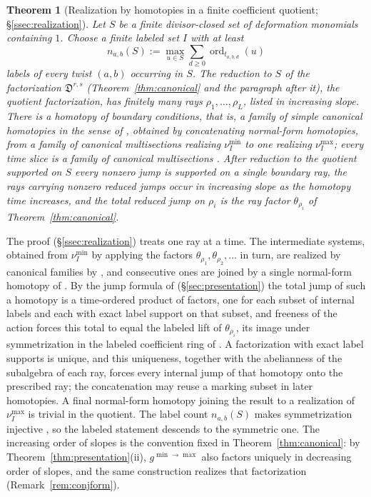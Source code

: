\documentclass[11pt]{amsart}
\newtheorem{theorem}{Theorem}[section]
\theoremstyle{definition}
\theoremstyle{remark}
\newcommand{\Dscr}{\mathfrak{D}}
\begin{document}
\begin{theorem}[Realization by homotopies in a finite coefficient quotient;
  \S\ref{ssec:realization}]
\label{thm:georealization}
Let $S$ be a finite divisor-closed set of deformation monomials containing
$1$.  Choose a finite labeled set $I$ with at least
\[
n_{a,b}(S):=\max_{u\in S}\sum_{d\ge0}\operatorname{ord}_{t_{a,b,d}}(u)
\]
  labels of every twist $(a,b)$ occurring in $S$.  The reduction to $S$ of the factorization $\Dscr^{r,s}$ (Theorem~\ref{thm:canonical} and the paragraph after it), the \emph{quotient
factorization}, has finitely many rays $\rho_1,\dots,\rho_L$, listed in
increasing slope.  There is a homotopy of boundary conditions, that is, a
family of simple canonical homotopies in the sense of
\cite[Defs.~3.36--3.37]{GKT}, obtained by concatenating normal-form
homotopies, from a family of canonical multisections realizing
$\nu_I^{\min}$ to one realizing $\nu_I^{\max}$; every
time slice is a family of canonical multisections \cite[Def.~3.22]{GKT}.
After reduction to the quotient supported on $S$ every nonzero
jump is supported on a single boundary ray, the rays carrying
nonzero reduced jumps occur in increasing slope as the homotopy time
increases, and the total reduced jump on $\rho_{i}$ is the ray factor
$\theta_{\rho_{i}}$ of Theorem~\ref{thm:canonical}.
\end{theorem}

The proof (\S\ref{ssec:realization}) treats one ray at a time.  The
intermediate systems, obtained from $\nu_I^{\min}$ by applying the factors
$\theta_{\rho_1},\theta_{\rho_2},\dots$ in turn, are realized by canonical
families by \cite[Cor.~5.14]{GKT}, and consecutive ones are joined by a single
normal-form homotopy of \cite[Lem.~3.40]{GKT}.  By the jump formula of
\cite[proof of Thm.~5.9]{GKT} (\S\ref{sec:presentation}) the
total jump of such a homotopy is a time-ordered product of factors, one for
each subset of internal labels and each with exact label support on that
subset, and freeness of the action forces this total to equal the labeled
lift of $\theta_{\rho_i}$, its image under symmetrization in the labeled
coefficient ring of \cite[Def.~4.6]{GKT}.  A factorization with exact label supports is
unique, and this uniqueness, together with the abelianness of the subalgebra
of each ray, forces every internal jump of that homotopy onto the prescribed
ray; the concatenation may reuse a marking subset in later homotopies.  A final
normal-form homotopy joining the result to a realization of $\nu_I^{\max}$ is
trivial in the quotient.  The label count $n_{a,b}(S)$ makes symmetrization
injective \cite[Lem.~4.14]{GKT}, so the labeled statement descends to the
symmetric one.  The increasing order of slopes is the convention fixed in
Theorem~\ref{thm:canonical}: by Theorem~\ref{thm:presentation}(ii),
$g^{\min\to\max}$ also factors uniquely in decreasing order of slopes, and the
same construction realizes that factorization (Remark~\ref{rem:conjform}).
\end{document}
